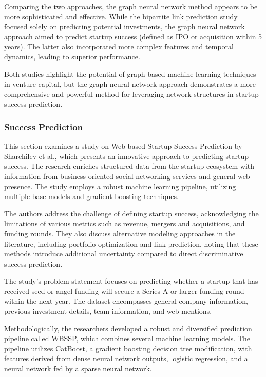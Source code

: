 \documentclass[a4paper, oneside]{discothesis}
\begin{document}
Comparing the two approaches, the graph neural network method appears to be more sophisticated and effective. While the bipartite link prediction study focused solely on predicting potential investments, the graph neural network approach aimed to predict startup success (defined as IPO or acquisition within 5 years). The latter also incorporated more complex features and temporal dynamics, leading to superior performance.

Both studies highlight the potential of graph-based machine learning techniques in venture capital, but the graph neural network approach demonstrates a more comprehensive and powerful method for leveraging network structures in startup success prediction.

\subsubsection{Success Prediction}

This section examines a study on Web-based Startup Success Prediction by Sharchilev et al., which presents an innovative approach to predicting startup success. The research enriches structured data from the startup ecosystem with information from business-oriented social networking services and general web presence. The study employs a robust machine learning pipeline, utilizing multiple base models and gradient boosting techniques.

The authors address the challenge of defining startup success, acknowledging the limitations of various metrics such as revenue, mergers and acquisitions, and funding rounds. They also discuss alternative modeling approaches in the literature, including portfolio optimization and link prediction, noting that these methods introduce additional uncertainty compared to direct discriminative success prediction.

The study's problem statement focuses on predicting whether a startup that has received seed or angel funding will secure a Series A or larger funding round within the next year. The dataset encompasses general company information, previous investment details, team information, and web mentions.

Methodologically, the researchers developed a robust and diversified prediction pipeline called WBSSP, which combines several machine learning models. The pipeline utilizes CatBoost, a gradient boosting decision tree modification, with features derived from dense neural network outputs, logistic regression, and a neural network fed by a sparse neural network.
\end{document}
